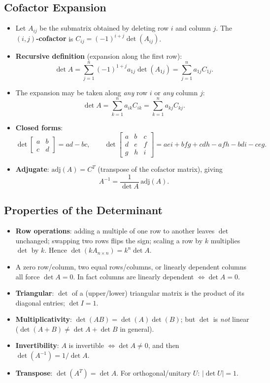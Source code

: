 \documentclass[hidelinks]{article}
\begin{document}
\subsection{Cofactor Expansion}
\begin{itemize}
    \item Let $A_{ij}$ be the submatrix obtained by deleting row $i$ and column $j$. The \textbf{$(i,j)$-cofactor} is $C_{ij} = (-1)^{i+j}\det(A_{ij})$.
    \item \textbf{Recursive definition} (expansion along the first row):
    \[
        \det A = \sum_{j=1}^{n} (-1)^{1+j} a_{1j}\det(A_{1j}) = \sum_{j=1}^n a_{1j} C_{1j}.
    \]
    \item The expansion may be taken along \emph{any} row $i$ or \emph{any} column $j$:
    \[
        \det A = \sum_{k=1}^n a_{ik} C_{ik} = \sum_{k=1}^n a_{kj} C_{kj}.
    \]
    \item \textbf{Closed forms}:
    \[
        \det\begin{bmatrix}a&b\\c&d\end{bmatrix} = ad-bc,\qquad
        \det\begin{bmatrix}a&b&c\\d&e&f\\g&h&i\end{bmatrix} = aei+bfg+cdh-afh-bdi-ceg.
    \]
    \item \textbf{Adjugate}: $\mathrm{adj}(A) = C^T$ (transpose of the cofactor matrix), giving
    \[
        A^{-1} = \frac{1}{\det A}\,\mathrm{adj}(A).
    \]
\end{itemize}

\subsection{Properties of the Determinant}
\begin{itemize}
    \item \textbf{Row operations}: adding a multiple of one row to another leaves $\det$ unchanged; swapping two rows flips the sign; scaling a row by $k$ multiplies $\det$ by $k$. Hence $\det(kA_{n\times n}) = k^n\det A$.
    \item A zero row/column, two equal rows/columns, or linearly dependent columns all force $\det A = 0$. In fact columns are linearly dependent $\iff \det A = 0$.
    \item \textbf{Triangular}: $\det$ of a (upper/lower) triangular matrix is the product of its diagonal entries; $\det I = 1$.
    \item \textbf{Multiplicativity}: $\det(AB) = \det(A)\det(B)$; but $\det$ is \emph{not} linear ($\det(A+B)\neq\det A + \det B$ in general).
    \item \textbf{Invertibility}: $A$ is invertible $\iff \det A \neq 0$, and then $\det(A^{-1}) = 1/\det A$.
    \item \textbf{Transpose}: $\det(A^T) = \det A$. For orthogonal/unitary $U$: $|\det U| = 1$.
\end{itemize}
\end{document}
